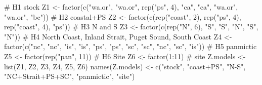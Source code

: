 \begin{Schunk}
\begin{Sinput}
 # H1 stock
 Z1 <- factor(c("wa.or", "wa.or", rep("ps", 4), 
                "ca", "ca", "wa.or", "wa.or", "bc"))
 # H2 coastal+PS
 Z2 <- factor(c(rep("coast", 2), rep("ps", 4), rep("coast", 4), "ps"))
 # H3 N and S
 Z3 <- factor(c(rep("N", 6), "S", "S", "N", "S", "N"))
 # H4 North Coast, Inland Strait, Puget Sound, South Coast
 Z4 <- factor(c("nc", "nc", "is", "is", "ps", "ps", 
                "sc", "sc", "nc", "sc", "is"))
 # H5 panmictic
 Z5 <- factor(rep("pan", 11))
 # H6 Site
 Z6 <- factor(1:11) # site
 Z.models <- list(Z1, Z2, Z3, Z4, Z5, Z6)
 names(Z.models) <-
   c("stock", "coast+PS", "N-S", "NC+Strait+PS+SC", "panmictic", "site")
\end{Sinput}
\end{Schunk}

